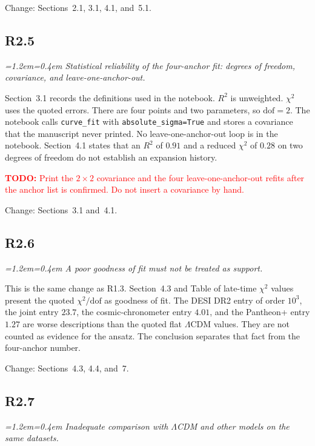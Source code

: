 \documentclass[11pt,a4paper]{article}
\newenvironment{review}{\par\color{revcolor}\itshape\leftskip=1.2em\rightskip=0.4em\noindent}{\par\leftskip=0pt\rightskip=0pt}
\newcommand{\revtodo}[1]{\textcolor{red}{\textbf{TODO:} #1}}
\begin{document}
Change: Sections~2.1, 3.1, 4.1, and~5.1.

\subsection*{R2.5}
\begin{review}
Statistical reliability of the four-anchor fit: degrees of freedom, covariance, and leave-one-anchor-out.
\end{review}

Section~3.1 records the definitions used in the notebook.
$R^2$ is unweighted.
$\chi^2$ uses the quoted errors.
There are four points and two parameters, so $\mathrm{dof} = 2$.
The notebook calls \texttt{curve\_fit} with \texttt{absolute\_sigma=True} and stores a covariance that the manuscript never printed.
No leave-one-anchor-out loop is in the notebook.
Section~4.1 states that an $R^2$ of $0.91$ and a reduced $\chi^2$ of $0.28$ on two degrees of freedom do not establish an expansion history.

\revtodo{Print the $2\times 2$ covariance and the four leave-one-anchor-out refits after the anchor list is confirmed. Do not insert a covariance by hand.}

Change: Sections~3.1 and~4.1.

\subsection*{R2.6}
\begin{review}
A poor goodness of fit must not be treated as support.
\end{review}

This is the same change as R1.3.
Section~4.3 and Table of late-time $\chi^2$ values present the quoted $\chi^2/\mathrm{dof}$ as goodness of fit.
The DESI DR2 entry of order $10^{3}$, the joint entry $23.7$, the cosmic-chronometer entry $4.01$, and the Pantheon+ entry $1.27$ are worse descriptions than the quoted flat $\Lambda$CDM values.
They are not counted as evidence for the ansatz.
The conclusion separates that fact from the four-anchor number.

Change: Sections~4.3, 4.4, and~7.

\subsection*{R2.7}
\begin{review}
Inadequate comparison with $\Lambda$CDM and other models on the same datasets.
\end{review}
\end{document}
